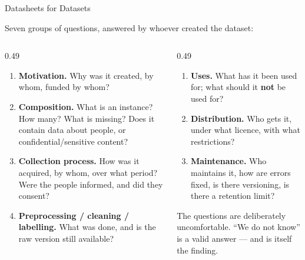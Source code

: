 \begin{frame}[allowframebreaks]{Datasheets for Datasets}

    Seven groups of questions, answered by whoever created the dataset:

    \vspace{0.18em}

    \begin{columns}[T]
        \begin{column}{0.49\textwidth}
            \begin{enumerate}\scriptsize
                \setlength\itemsep{0.1em}
                \item \textbf{Motivation.} Why was it created, by whom, funded by whom?
                \item \textbf{Composition.} What is an instance? How many? What is missing? Does it
                      contain data about people, or confidential/sensitive content?
                \item \textbf{Collection process.} How was it acquired, by whom, over what period?
                      Were the people informed, and did they consent?
                \item \textbf{Preprocessing / cleaning / labelling.} What was done, and is the raw
                      version still available?
            \end{enumerate}
        \end{column}
        \begin{column}{0.49\textwidth}
            \begin{enumerate}\scriptsize
                \setlength\itemsep{0.1em}
                \setcounter{enumi}{4}
                \item \textbf{Uses.} What has it been used for; what should it \textbf{not} be used
                      for?
                \item \textbf{Distribution.} Who gets it, under what licence, with what
                      restrictions?
                \item \textbf{Maintenance.} Who maintains it, how are errors fixed, is there
                      versioning, is there a retention limit?
            \end{enumerate}

            \vspace{0.15em}
            \begin{tcolorbox}[colback=raiAmber!5, colframe=raiAmber!70, boxrule=0.6pt]
                \scriptsize The questions are deliberately uncomfortable. ``We do not know'' is a
                valid answer --- and is itself the finding.
            \end{tcolorbox}


\end{column}
\end{columns}
\end{frame}
